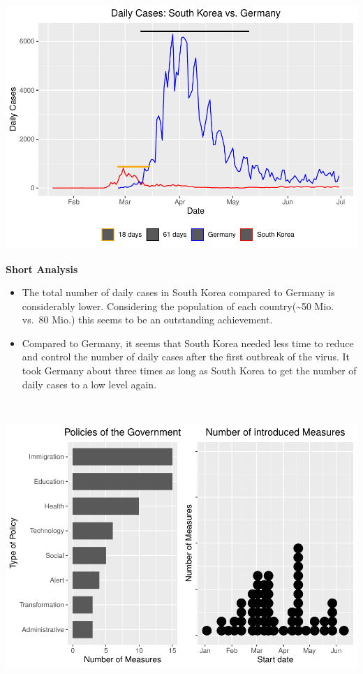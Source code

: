 \documentclass[
]{article}
\providecommand{\tightlist}{%
  \setlength{\itemsep}{0pt}\setlength{\parskip}{0pt}}
\begin{document}
\includegraphics{Main_Analysis_files/figure-latex/unnamed-chunk-9-1.pdf}

\textbf{Short Analysis}

\begin{itemize}
\tightlist
\item
  The total number of daily cases in South Korea compared to Germany is
  considerably lower. Considering the population of each
  country(\textasciitilde50 Mio. vs.~80 Mio.) this seems to be an
  outstanding achievement.
\item
  Compared to Germany, it seems that South Korea needed less time to
  reduce and control the number of daily cases after the first outbreak
  of the virus. It took Germany about three times as long as South Korea
  to get the number of daily cases to a low level again.
\end{itemize}

~

\includegraphics{Main_Analysis_files/figure-latex/unnamed-chunk-10-1.pdf}
\end{document}
